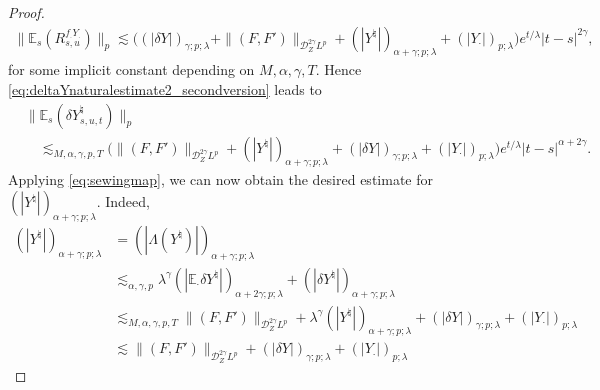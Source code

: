 \documentclass[11pt,a4paper]{article}
\newcommand{\E}{\mathbb{E}}
\theoremstyle{plain}
\begin{document}
\begin{proof}
\begin{equation*}
\begin{aligned}
        \|\E_s(R_{s,u}^{f_\cdot Y_\cdot})\|_p %
        \lesssim \big( (|\delta Y|)_{\gamma;p;\lambda} + \|(F,F')\|_{\mathscr{D}^{2\gamma}_ZL^{p}} + (|Y^\natural|)_{\alpha+\gamma;p;\lambda} + (|Y_\cdot|)_{p;\lambda} \big)  e^{t/\lambda} |t-s|^{2\gamma},
    \end{aligned}
    \end{equation*} 
    for some implicit constant depending on $M,\alpha,\gamma,T$. 
    Hence \eqref{eq:deltaYnaturalestimate2_secondversion} leads to
    \begin{equation} \label{eq:deltaYnaturalestimate2}
        \begin{aligned}
            &\|\E_s(\delta Y^\natural_{s,u,t})\|_p \\
            &\quad \lesssim_{M,\alpha,\gamma,p,T} \big( \|(F,F')\|_{\mathscr{D}^{2\gamma}_ZL^{p}} +(|Y^\natural|)_{\alpha+\gamma;p;\lambda}  + (|\delta Y|)_{\gamma;p;\lambda} +  (|Y_\cdot|)_{p;\lambda}\big) e^{t/\lambda} |t-s|^{\alpha+2\gamma}.
        \end{aligned}
    \end{equation}
    Applying \eqref{eq:sewingmap},  we can now obtain the desired estimate for $(|Y^\natural|)_{\alpha+\gamma;p;\lambda}$. Indeed, \begin{equation} \label{eq:corollaryaprioiestimates2}
        \begin{aligned}
             (|Y^\natural|)_{\alpha+\gamma;p;\lambda} &= (|\Lambda(Y^\natural)|)_{\alpha+\gamma;p;\lambda}  \\
             &\lesssim_{\alpha,\gamma,p} \lambda^\gamma(|\E_\cdot \delta Y^\natural|)_{\alpha+2\gamma;p;\lambda}+(|\delta Y^\natural|)_{\alpha+\gamma;p;\lambda}  \\ 
             &\lesssim_{M,\alpha,\gamma,p,T} \|(F,F')\|_{\mathscr{D}^{2\gamma}_ZL^{p}} + \lambda^\gamma (| Y^\natural|)_{\alpha+\gamma;p;\lambda} + (|\delta Y|)_{\gamma;p;\lambda} + (|Y_\cdot|)_{p;\lambda}  \\ 
             &\lesssim \|(F,F')\|_{\mathscr{D}^{2\gamma}_ZL^{p}} + (|\delta Y|)_{\gamma;p;\lambda} +  (|Y_\cdot|)_{p;\lambda} 

\end{aligned}
\end{equation}
\end{proof}
\end{document}
